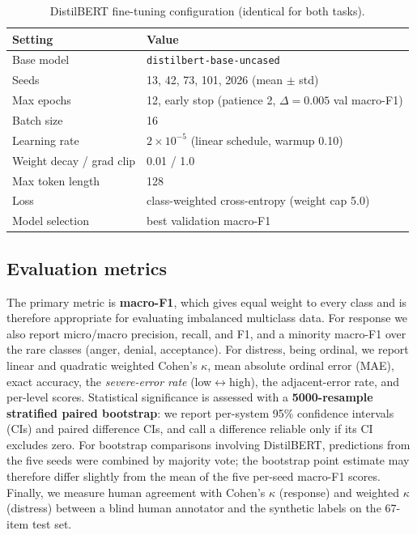 \documentclass[11pt,a4paper]{article}
\begin{document}
\begin{table}[H]
  \centering
  \small
  \caption{DistilBERT fine-tuning configuration (identical for both tasks).}
  \label{tab:hyper}
  \begin{tabular}{@{}ll@{}}
    \toprule
    Setting & Value\\
    \midrule
    Base model & \texttt{distilbert-base-uncased}\\
    Seeds & 13, 42, 73, 101, 2026 (mean $\pm$ std)\\
    Max epochs & 12, early stop (patience 2, $\Delta=0.005$ val macro-F1)\\
    Batch size & 16\\
    Learning rate & $2\times10^{-5}$ (linear schedule, warmup 0.10)\\
    Weight decay / grad clip & 0.01 / 1.0\\
    Max token length & 128\\
    Loss & class-weighted cross-entropy (weight cap 5.0)\\
    Model selection & best validation macro-F1\\
    \bottomrule
  \end{tabular}
\end{table}

\subsection{Evaluation metrics}
The primary metric is \textbf{macro-F1}, which gives equal weight to every class and is therefore
appropriate for evaluating imbalanced multiclass data. For response we also report micro/macro precision, recall, and F1, and a minority
macro-F1 over the rare classes (anger, denial, acceptance). For distress, being ordinal, we report
linear and quadratic weighted Cohen's $\kappa$, mean absolute ordinal error (MAE), exact accuracy, the
\emph{severe-error rate} (low$\leftrightarrow$high), the adjacent-error rate, and per-level scores.
Statistical significance is assessed with a \textbf{5000-resample stratified paired bootstrap}: we
report per-system 95\% confidence intervals (CIs) and paired difference CIs, and call a difference
reliable only if its CI excludes zero. For bootstrap comparisons involving DistilBERT, predictions from
the five seeds were combined by majority vote; the bootstrap point estimate may therefore differ
slightly from the mean of the five per-seed macro-F1 scores. Finally, we measure human agreement with Cohen's $\kappa$
(response) and weighted $\kappa$ (distress) between a blind human annotator and the synthetic labels on
the 67-item test set.
\end{document}
